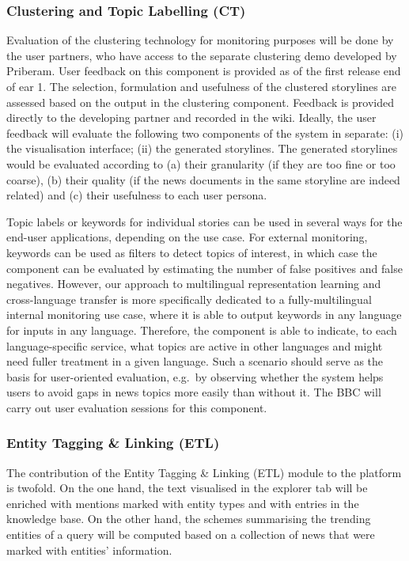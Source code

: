 \subsubsection{Clustering and Topic Labelling (CT)}\label{sec:validation-clustering}

Evaluation of the \SUMMA clustering technology for monitoring purposes will be done by the user partners, who have access to the separate clustering demo developed by Priberam. User feedback on this component is provided as of the first release  end of ear 1. 
The selection, formulation and usefulness of the clustered storylines are assessed based on the output in the clustering component. Feedback is provided directly to the developing partner and recorded in the \SUMMA wiki. Ideally, the user feedback will evaluate the following two components of the system in separate: (i) the visualisation interface; (ii) the generated storylines. The generated storylines would be evaluated according to (a) their granularity (if they are too fine or too coarse), (b) their quality (if the news documents in the same storyline are indeed related) and (c) their usefulness to each user persona.

Topic labels or keywords for individual stories can be used in several ways for the end-user applications, depending on the use case.  For external monitoring, keywords can be used as filters to detect topics of interest, in which case the component can be evaluated by estimating the number of false positives and false negatives.  However, our approach to multilingual representation learning and cross-language transfer is more specifically dedicated to a fully-multilingual internal monitoring use case, where it is able to output keywords in any language for inputs in any language.  Therefore, the component is able to indicate, to each language-specific service, what topics are active in other languages and might need fuller treatment in a given language.  Such a scenario should serve as the basis for user-oriented evaluation, e.g.\ by observing whether the system helps users to avoid gaps in news topics more easily than without it. The BBC will carry out user evaluation sessions for this component.


\subsubsection{Entity Tagging \& Linking (ETL)}\label{sec:validation-etl}

The contribution of the Entity Tagging \& Linking (ETL) module to the \SUMMA platform is twofold. On the one hand, the text visualised in the explorer tab will be enriched with mentions marked with entity types and with entries in the knowledge base. On the other hand, the schemes summarising the trending entities of a query will be computed based on a collection of news that were marked with entities’ information.

